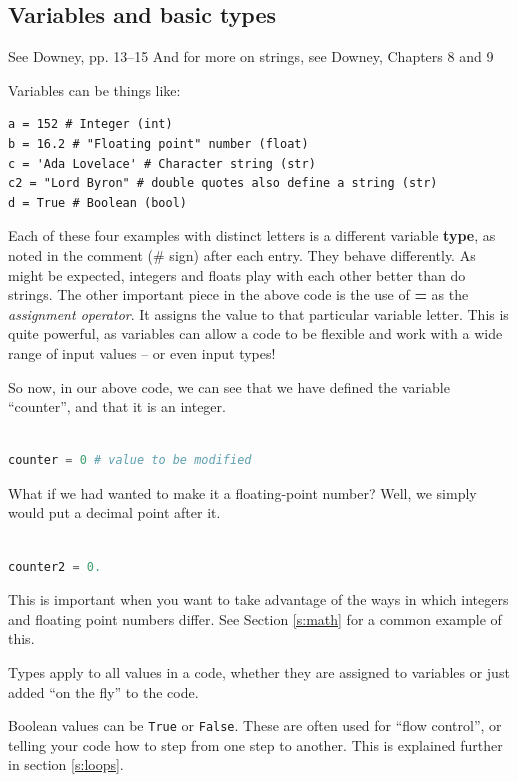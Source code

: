 \documentclass[a4paper,10pt]{scrartcl}
\begin{document}
\subsection{Variables and basic types}

\begin{framed}
See Downey, pp. 13--15
And for more on strings, see Downey, Chapters 8 and 9
\end{framed}

Variables can be things like:
\begin{lstlisting}
a = 152 # Integer (int)
b = 16.2 # "Floating point" number (float)
c = 'Ada Lovelace' # Character string (str)
c2 = "Lord Byron" # double quotes also define a string (str)
d = True # Boolean (bool)
\end{lstlisting}

Each of these four examples with distinct letters is a different variable \textbf{type}, as noted in the comment (\# sign) after each entry. They behave differently. As might be expected, integers and floats play with each other better than do strings. The other important piece in the above code is the use of \textbf{=} as the \emph{assignment operator}. It assigns the value to that particular variable letter. This is quite powerful, as variables can allow a code to be flexible and work with a wide range of input values -- or even input types!

So now, in our above code, we can see that we have defined the variable ``counter'', and that it is an integer.
\begin{lstlisting}[belowskip=-1.6\baselineskip, language=python]

counter = 0 # value to be modified
\end{lstlisting}

What if we had wanted to make it a floating-point number? Well, we simply would put a decimal point after it.
\begin{lstlisting}[belowskip=-1.6\baselineskip, language=python]

counter2 = 0.
\end{lstlisting}

This is important when you want to take advantage of the ways in which integers and floating point numbers differ. See Section \ref{s:math} for a common example of this.

Types apply to all values in a code, whether they are assigned to variables or just added ``on the fly'' to the code.

Boolean values can be \lstinline{True} or \lstinline{False}. These are often used for ``flow control'', or telling your code how to step from one step to another. This is explained further in section \ref{s:loops}.
\end{document}
